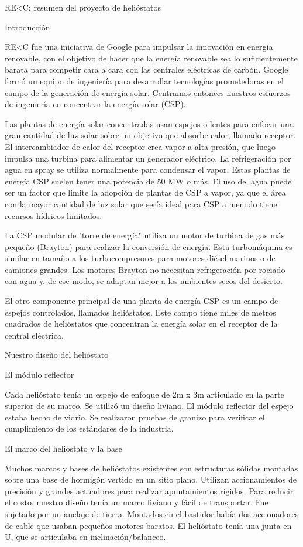 \documentclass[12pt]{article}
\begin{document}
RE<C: resumen del proyecto de helióstatos

Introducción

RE<C fue una iniciativa de Google para impulsar la innovación en energía renovable, con el objetivo de hacer que la energía renovable sea lo suficientemente barata para competir cara a cara con las centrales eléctricas de carbón. Google formó un equipo de ingeniería para desarrollar tecnologías prometedoras en el campo de la generación de energía solar. Centramos entonces nuestros esfuerzos de ingeniería en concentrar la energía solar (CSP).

Las plantas de energía solar concentradas usan espejos o lentes para enfocar una gran cantidad de luz solar sobre un objetivo que absorbe calor, llamado receptor. El intercambiador de calor del receptor crea vapor a alta presión, que luego impulsa una turbina para alimentar un generador eléctrico. La refrigeración por agua en spray se utiliza normalmente para condensar el vapor. Estas plantas de energía CSP suelen tener una potencia de 50 MW o más. El uso del agua puede ser un factor que limite la adopción de plantas de CSP a vapor, ya que el área con la mayor cantidad de luz solar que sería ideal para CSP a menudo tiene recursos hídricos limitados.

La CSP modular de "torre de energía" utiliza un motor de turbina de gas más pequeño (Brayton) para realizar la conversión de energía. Esta turbomáquina es similar en tamaño a los turbocompresores para motores diésel marinos o de camiones grandes. Los motores Brayton no necesitan refrigeración por rociado con agua y, de ese modo, se adaptan mejor a los ambientes secos del desierto.

El otro componente principal de una planta de energía CSP es un campo de espejos controlados, llamados helióstatos. Este campo tiene miles de metros cuadrados de helióstatos que concentran la energía solar en el receptor de la central eléctrica.

Nuestro diseño del helióstato

El módulo reflector

Cada helióstato tenía un espejo de enfoque de 2m x 3m articulado en la parte superior de su marco. Se utilizó un diseño liviano. El módulo reflector del espejo estaba hecho de vidrio. Se realizaron pruebas de granizo para verificar el cumplimiento de los estándares de la industria.

El marco del helióstato y la base

Muchos marcos y bases de helióstatos existentes son estructuras sólidas montadas sobre una base de hormigón vertido en un sitio plano. Utilizan accionamientos de precisión y grandes actuadores para realizar apuntamientos rígidos. Para reducir el costo, nuestro diseño tenía un marco liviano y fácil de transportar. Fue sujetado por un anclaje de tierra. Montados en el bastidor había dos accionadores de cable que usaban pequeños motores baratos. El helióstato tenía una junta en U, que se articulaba en inclinación/balanceo.
\end{document}
